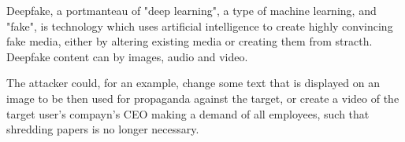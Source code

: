 Deepfake, a portmanteau of "deep learning", a type of machine learning, and "fake", is technology which uses artificial intelligence to create highly convincing fake media, either by altering existing media or creating them from stracth. Deepfake content can by images, audio and video.

The attacker could, for an example, change some text that is displayed on an image to be then used for propaganda against the target, or create a video of the target user's compayn's CEO making a demand of all employees, such that shredding papers is no longer necessary.


\begin{comment}
    
    - 

\end{comment}

